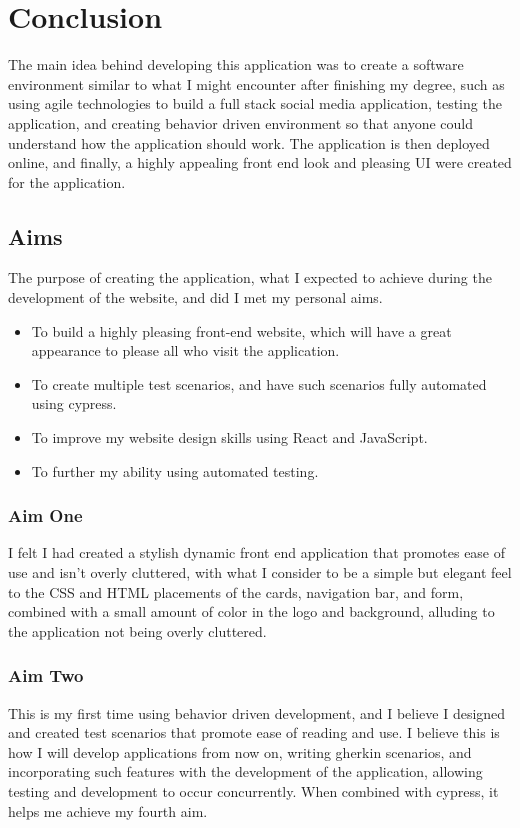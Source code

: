 \chapter{Conclusion}
The main idea behind developing this application was to create a software environment similar to what I might encounter after finishing my degree, such as using agile technologies to build a full stack social media application, testing the application, and creating behavior driven environment so that anyone could understand how the application should work. The application is then deployed online, and finally, a highly appealing front end look and pleasing UI were created for the application.

\section{Aims}
The purpose of creating the application, what I expected to achieve during the development of the website, and did I met my personal aims.
\begin{itemize}
    \item To build a highly pleasing front-end website, which will have a great appearance to please all who visit the application.
    \item To create multiple test scenarios, and have such scenarios fully automated using cypress.
    \item To improve my website design skills using React and JavaScript.
    \item To further my ability using automated testing.
\end{itemize}

\subsection{Aim One}
I felt I had created a stylish dynamic front end application that promotes ease of use and isn't overly cluttered, with what I consider to be a simple but elegant feel to the CSS and HTML placements of the cards, navigation bar, and form, combined with a small amount of color in the logo and background, alluding to the application not being overly cluttered.

\subsection{Aim Two}
This is my first time using behavior driven development, and I believe I designed and created test scenarios that promote ease of reading and use. I believe this is how I will develop applications from now on, writing gherkin scenarios, and incorporating such features with the development of the application, allowing testing and development to occur concurrently. When combined with cypress, it helps me achieve my fourth aim.

